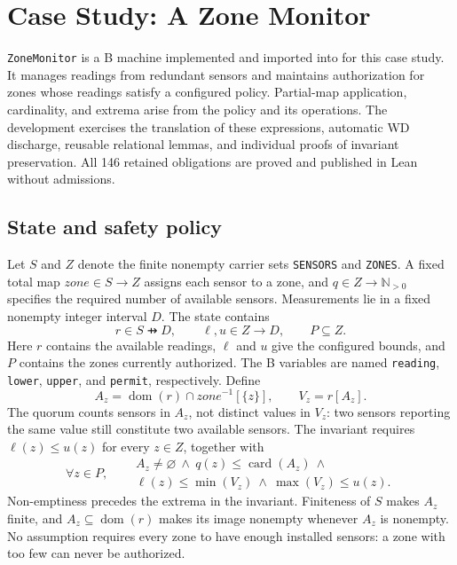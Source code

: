 \section{Case Study: A Zone Monitor}
\label{sec:evaluation}

\texttt{ZoneMonitor} is a B machine implemented and imported into \barrel
for this case study. It manages readings from redundant sensors and
maintains authorization for zones whose readings satisfy a configured
policy. Partial-map application, cardinality, and extrema arise from the
policy and its operations. The development exercises the translation of
these expressions, automatic WD discharge, reusable relational lemmas,
and individual proofs of invariant preservation. All 146 retained
obligations are proved and published in Lean without admissions.

\subsection{State and safety policy}

Let $S$ and $Z$ denote the finite nonempty carrier sets \texttt{SENSORS}
and \texttt{ZONES}. A fixed total map $\mathit{zone}\in S\to Z$ assigns
each sensor to a zone, and $q\in Z\to\mathbb{N}_{>0}$ specifies the
required number of available sensors. Measurements lie in a fixed nonempty
integer interval $D$. The state contains
\[
  r\in S\pfun D,\qquad
  \ell,u\in Z\to D,\qquad P\subseteq Z.
\]
Here $r$ contains the available readings, $\ell$ and $u$ give the configured
bounds, and $P$ contains the zones currently authorized. The B variables
are named \texttt{reading}, \texttt{lower}, \texttt{upper}, and
\texttt{permit}, respectively. Define
\[
  A_z=\operatorname{dom}(r)\cap\mathit{zone}^{-1}[\{z\}],
  \qquad V_z=r[A_z].
\]
The quorum counts sensors in $A_z$, not distinct values in $V_z$: two sensors
reporting the same value still constitute two available sensors. The invariant
requires $\ell(z)\le u(z)$ for every $z\in Z$, together with
\begin{equation}
\label{eq:zone-policy}
\forall z\in P,\quad
\begin{aligned}
  &A_z\ne\varnothing\ \land\ q(z)\le\operatorname{card}(A_z)\ \land{}\\
  &\ell(z)\le\min(V_z)\ \land\ \max(V_z)\le u(z).
\end{aligned}
\end{equation}
Non-emptiness precedes the extrema in the invariant. Finiteness of $S$
makes $A_z$ finite, and $A_z\subseteq\operatorname{dom}(r)$ makes its image
nonempty whenever $A_z$ is nonempty. No assumption requires every zone to
have enough installed sensors: a zone with too few can never be authorized.

